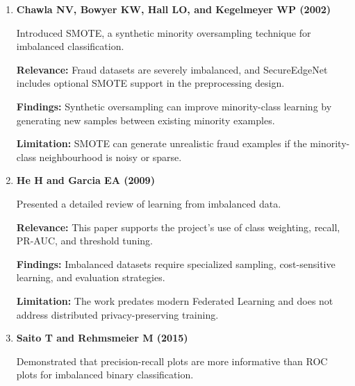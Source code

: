\begin{enumerate}
    Investigated sequence classification for credit card fraud detection using transaction histories.

    \textbf{Relevance:} The work demonstrates that fraud often depends on temporal and behavioural context, motivating future sequence modelling extensions.

    \textbf{Findings:} Sequential models can exploit cardholder behaviour over time and improve detection beyond isolated transaction classification.

    \textbf{Limitation:} The current SecureEdgeNet implementation uses tabular transaction features and does not yet include sequence neural networks.

    \item \textbf{Chawla NV, Bowyer KW, Hall LO, and Kegelmeyer WP (2002) \cite{ref7}}

    Introduced SMOTE, a synthetic minority oversampling technique for imbalanced classification.

    \textbf{Relevance:} Fraud datasets are severely imbalanced, and SecureEdgeNet includes optional SMOTE support in the preprocessing design.

    \textbf{Findings:} Synthetic oversampling can improve minority-class learning by generating new samples between existing minority examples.

    \textbf{Limitation:} SMOTE can generate unrealistic fraud examples if the minority-class neighbourhood is noisy or sparse.

    \item \textbf{He H and Garcia EA (2009) \cite{ref8}}

    Presented a detailed review of learning from imbalanced data.

    \textbf{Relevance:} This paper supports the project's use of class weighting, recall, PR-AUC, and threshold tuning.

    \textbf{Findings:} Imbalanced datasets require specialized sampling, cost-sensitive learning, and evaluation strategies.

    \textbf{Limitation:} The work predates modern Federated Learning and does not address distributed privacy-preserving training.

    \item \textbf{Saito T and Rehmsmeier M (2015) \cite{ref9}}

    Demonstrated that precision-recall plots are more informative than ROC plots for imbalanced binary classification.


\end{enumerate}
